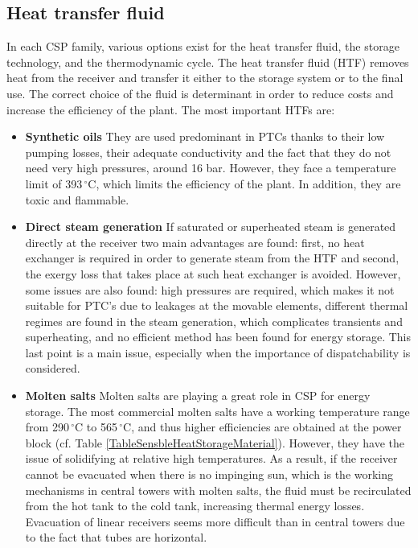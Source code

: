 \documentclass[Master,MEE,english]{twbook}%
\begin{document}
\subsection{Heat transfer fluid} \label{subsection_HTF}
In each CSP family, various options exist for the heat transfer fluid, the storage technology, and the thermodynamic cycle. The heat transfer fluid (HTF) removes heat from the receiver and transfer it either to the storage system or to the final use. The correct choice of the fluid is determinant in order to reduce costs and increase the efficiency of the plant. The most important HTFs are:
\begin{itemize}
\item \textbf{Synthetic oils} They are used predominant in PTCs thanks to their low pumping losses, their adequate conductivity and the fact that they do not need very high pressures, around 16 bar. However, they face a temperature limit of 393$\,^{\circ}\mathrm{C}$, which limits the efficiency of the plant. In addition, they are toxic and flammable.
\item \textbf{Direct steam generation} If saturated or superheated steam is generated directly at the receiver two main advantages are found: first, no heat exchanger is required in order to generate steam from the HTF and second, the exergy loss that takes place at such heat exchanger is avoided. However, some issues are also found: high pressures are required, which makes it not suitable for PTC's due to leakages at the movable elements, different thermal regimes are found in the steam generation, which complicates transients and superheating, and no efficient method has been found for energy storage. This last point is a main issue, especially when the importance of dispatchability is considered.
\item \textbf{Molten salts} Molten salts are playing a great role in CSP for energy storage. The most commercial molten salts have a working temperature range from 290$\,^{\circ}\mathrm{C}$ to 565$\,^{\circ}\mathrm{C}$, and thus higher efficiencies are obtained at the power block (cf. Table \ref{TableSensbleHeatStorageMaterial}). However, they have the issue of solidifying at relative high temperatures. As a result, if the receiver cannot be evacuated when there is no impinging sun, which is the working mechanisms in central towers with molten salts, the fluid must be recirculated from the hot tank to the cold tank, increasing thermal energy losses. Evacuation of linear receivers seems more difficult than in central towers due to the fact that tubes are horizontal.

\end{itemize}
\end{document}
